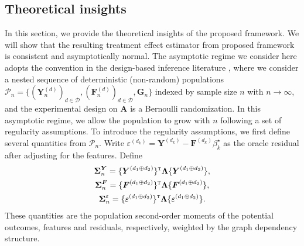 \documentclass{article}
\theoremstyle{plain}
\theoremstyle{definition}
\theoremstyle{remark}
\def\T{{\textsc{t}}}
\newcommand{\bY}{\boldsymbol{Y}}
\newcommand{\bA}{\boldsymbol{A}}
\newcommand{\bG}{\boldsymbol{G}}
\newcommand{\bF}{\boldsymbol{F}}
\newcommand{\bLambda}{\boldsymbol{\Lambda}}
\newcommand{\bSigma}{\boldsymbol{\Sigma}}
\newcommand{\cD}{\mathcal{D}}
\begin{document}
\subsection{Theoretical insights}
In this section, we provide the theoretical insights of the proposed framework. We will show that the resulting treatment effect estimator from proposed framework is consistent and asymptotically normal. The asymptotic regime we consider here adopts the convention in the design-based inference literature \citep{ding2024first, aronow2017estimating}, where we consider a nested sequence of deterministic (non-random) populations $\mathcal{P}_n = \{(\bY_n^{(d)})_{d\in\cD}, (\bF_n^{(d)})_{d\in\cD}, \bG_n\}$ indexed by sample size $n$ with $n\to\infty$, and the experimental design on $\bA$ is a Bernoulli randomization. In this asymptotic regime, we allow the population to grow with $n$ following a set of regularity assumptions. To introduce the regularity assumptions, we first define several quantities from $\mathcal{P}_n$. Write $\varepsilon^{(d_k)} = \bY^{(d_k)} - \bF^{(d_k)}\beta^\star_k$ as the oracle residual after adjusting for the features. Define 
\begin{gather*}
    \bSigma^{\bY}_n = \{\bY^{(d_1 \oplus d_2)}\}^{\T} \bLambda \{\bY^{(d_1 \oplus d_2)}\}, \\
    \bSigma^{\bF}_n = \{\bF^{(d_1 \oplus d_2)}\}^{\T} \bLambda \{\bF^{(d_1 \oplus d_2)}\}, \\
    \bSigma^{\varepsilon}_n = \{\varepsilon^{(d_1 \oplus d_2)}\}^{\T} \bLambda \{\varepsilon^{(d_1 \oplus d_2)}\}. 
\end{gather*}
These quantities are the population second-order moments of the potential outcomes, features and residuals, respectively, weighted by the graph dependency structure.  
\end{document}
